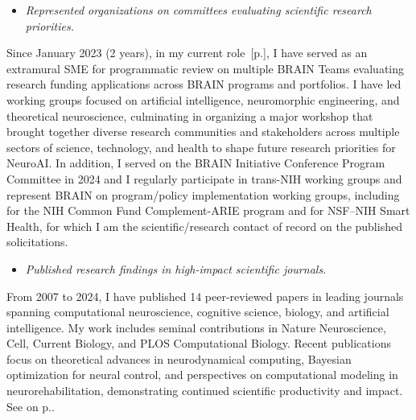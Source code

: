 \documentclass[10pt]{article}
\newcommand{\see}[1]{[\textcolor{hopkinsblue}{p.\pageref{sec:#1}}]}
\newcommand{\cf}[1]{\textcolor{hopkinsblue}{See \emph{\nameref{sec:#1}} on p.\pageref{sec:#1}}}
\begin{document}
\begin{itemize}
  \color{hopkinsblue}
  \item \emph{Represented organizations on committees evaluating scientific
research priorities.}
\end{itemize}

Since January 2023 (2 years), in my current role~\see{jobobd}, I have served as
an extramural SME for programmatic review on multiple BRAIN Teams evaluating
research funding applications across BRAIN programs and portfolios. I have led
working groups focused on artificial intelligence, neuromorphic engineering,
and theoretical neuroscience, culminating in organizing a major workshop that
brought together diverse research communities and stakeholders across multiple
sectors of science, technology, and health to shape future research priorities
for NeuroAI. In addition, I served on the BRAIN Initiative Conference Program
Committee in 2024 and I regularly participate in trans-NIH working groups and
represent BRAIN on program/policy implementation working groups, including for
the NIH Common Fund Complement-ARIE program and for NSF--NIH Smart Health,
for which I am the scientific/research contact of record on the published
solicitations.

\begin{itemize}
  \color{hopkinsblue}
  \item \emph{Published research findings in high-impact scientific journals.}
\end{itemize}

From 2007 to 2024, I have published 14 peer-reviewed papers in leading
journals spanning computational neuroscience, cognitive science, biology, and
artificial intelligence. My work includes seminal contributions in Nature
Neuroscience, Cell, Current Biology, and PLOS Computational Biology. Recent
publications focus on theoretical advances in neurodynamical computing, Bayesian
optimization for neural control, and perspectives on computational modeling in
neurorehabilitation, demonstrating continued scientific productivity and impact.
\cf{journalpubs}.

\end{document}
